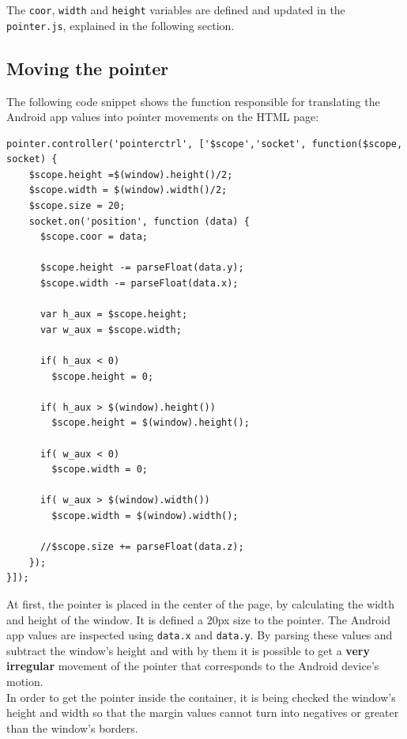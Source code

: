 \documentclass{llncs}
\begin{document}
The \texttt{coor}, \texttt{width} and \texttt{height} variables are defined and updated in the \texttt{pointer.js}, explained in the following section.

\subsection{Moving the pointer}

The following code snippet shows the function responsible for translating the Android app values into pointer movements on the HTML page:

\begin{lstlisting}
pointer.controller('pointerctrl', ['$scope','socket', function($scope, socket) {
    $scope.height =$(window).height()/2;
    $scope.width = $(window).width()/2;
    $scope.size = 20;
    socket.on('position', function (data) {
      $scope.coor = data;

      $scope.height -= parseFloat(data.y);
      $scope.width -= parseFloat(data.x);

      var h_aux = $scope.height;
      var w_aux = $scope.width;

      if( h_aux < 0)
        $scope.height = 0;

      if( h_aux > $(window).height())
        $scope.height = $(window).height();

      if( w_aux < 0)
        $scope.width = 0;

      if( w_aux > $(window).width())
        $scope.width = $(window).width();

      //$scope.size += parseFloat(data.z);
    });
}]);
\end{lstlisting}

At first, the pointer is placed in the center of the page, by calculating the width and height of the window. It is defined a 20px size to the pointer. The Android app values are inspected using \texttt{data.x} and \texttt{data.y}. By parsing these values and subtract the window's height and with by them it is possible to get a \textbf{very irregular} movement of the pointer that corresponds to the Android device's motion.
\\

\noindent In order to get the pointer inside the container, it is being checked the window's height and width so that the margin values cannot turn into negatives or greater than the window's borders.
\end{document}
